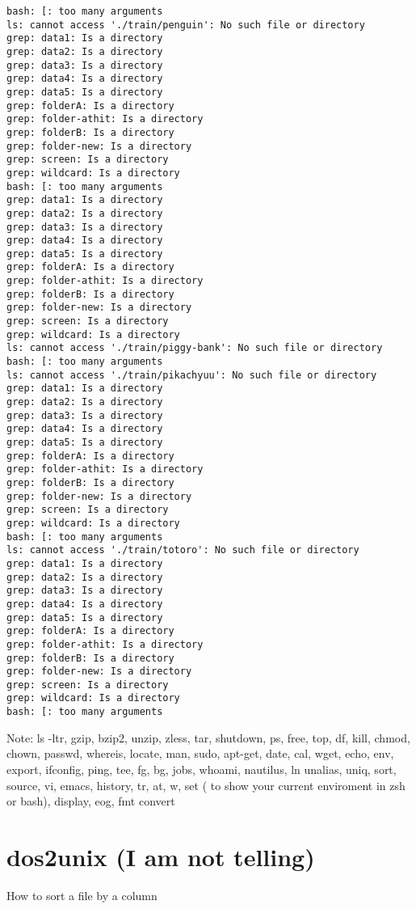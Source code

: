 \documentclass[11pt]{article}
\begin{document}
\begin{Verbatim}[commandchars=\\\{\}]
bash: [: too many arguments
ls: cannot access './train/penguin': No such file or directory
grep: data1: Is a directory
grep: data2: Is a directory
grep: data3: Is a directory
grep: data4: Is a directory
grep: data5: Is a directory
grep: folderA: Is a directory
grep: folder-athit: Is a directory
grep: folderB: Is a directory
grep: folder-new: Is a directory
grep: screen: Is a directory
grep: wildcard: Is a directory
bash: [: too many arguments
grep: data1: Is a directory
grep: data2: Is a directory
grep: data3: Is a directory
grep: data4: Is a directory
grep: data5: Is a directory
grep: folderA: Is a directory
grep: folder-athit: Is a directory
grep: folderB: Is a directory
grep: folder-new: Is a directory
grep: screen: Is a directory
grep: wildcard: Is a directory
ls: cannot access './train/piggy-bank': No such file or directory
bash: [: too many arguments
ls: cannot access './train/pikachyuu': No such file or directory
grep: data1: Is a directory
grep: data2: Is a directory
grep: data3: Is a directory
grep: data4: Is a directory
grep: data5: Is a directory
grep: folderA: Is a directory
grep: folder-athit: Is a directory
grep: folderB: Is a directory
grep: folder-new: Is a directory
grep: screen: Is a directory
grep: wildcard: Is a directory
bash: [: too many arguments
ls: cannot access './train/totoro': No such file or directory
grep: data1: Is a directory
grep: data2: Is a directory
grep: data3: Is a directory
grep: data4: Is a directory
grep: data5: Is a directory
grep: folderA: Is a directory
grep: folder-athit: Is a directory
grep: folderB: Is a directory
grep: folder-new: Is a directory
grep: screen: Is a directory
grep: wildcard: Is a directory
bash: [: too many arguments

    \end{Verbatim}

    Note: ls -ltr, gzip, bzip2, unzip, zless, tar, shutdown, ps, free, top,
df, kill, chmod, chown, passwd, whereis, locate, man, sudo, apt-get,
date, cal, wget, echo, env, export, ifconfig, ping, tee, fg, bg, jobs,
whoami, nautilus, ln unalias, uniq, sort, source, vi, emacs, history,
tr, at, w, set ( to show your current enviroment in zsh or bash),
display, eog, fmt convert

\section{dos2unix (I am not telling)}\label{dos2unix-i-am-not-telling}

How to sort a file by a column
\end{document}
